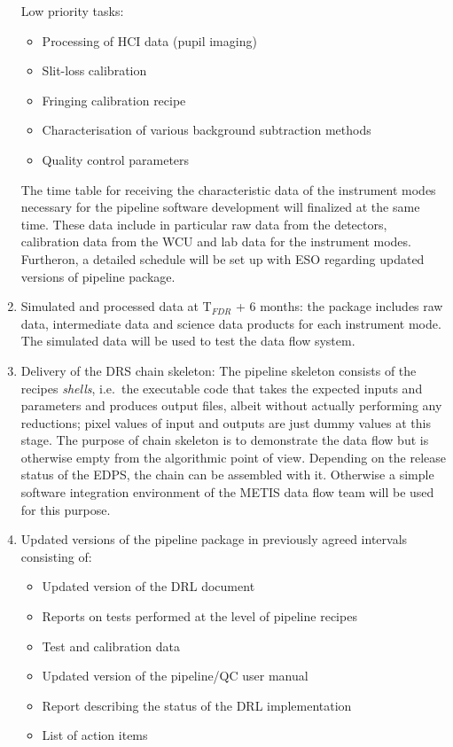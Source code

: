 \begin{enumerate}
    Low priority tasks:
    \begin{itemize}
        \item Processing of HCI data (pupil imaging)
        \item Slit-loss calibration
        \item Fringing calibration recipe 
        \item Characterisation of various background subtraction methods
        \item Quality control parameters
    \end{itemize}
    The time table for receiving the characteristic data of the instrument modes necessary for the pipeline software development will finalized at the same time. These data include in particular raw data from the detectors, calibration data from the \ac{WCU} and lab data for the instrument modes. Furtheron, a detailed schedule will be set up with ESO regarding updated versions of pipeline package.
    
    \item Simulated and processed data at T$_{FDR}$ + 6 months: the package includes raw data, intermediate data and science data products for each instrument mode. The simulated data will be used to test the data flow system.
    
    \item Delivery of the DRS chain skeleton: The pipeline skeleton consists of the recipes \emph{shells}, i.e.~the executable code that takes the expected inputs and parameters and produces output files, albeit without actually performing any reductions; pixel values of input and outputs are just dummy values at this stage. The purpose of chain skeleton is to demonstrate the data flow but is otherwise empty from the algorithmic point of view. Depending on the release status of the \ac{EDPS}, the chain can be assembled with it. Otherwise a simple software integration environment of the METIS data flow team will be used for this purpose. 

    \item Updated versions of the pipeline package in previously agreed intervals consisting of:
    \begin{itemize}
        \item Updated version of the DRL document
        \item Reports on tests performed at the level of pipeline recipes
        \item Test and calibration data
        \item Updated version of the pipeline/QC user manual
        \item Report describing the status of the DRL implementation
        \item List of action items
    \end{itemize}
\end{enumerate}



